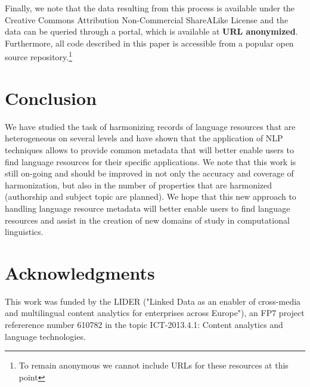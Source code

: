 \documentclass[11pt]{article}
\begin{document}
Finally, we note that the data resulting from this process is available under
the Creative Commons Attribution Non-Commercial ShareALike License and the data
can be queried through a portal, which is available at \textbf{URL anonymized}.
Furthermore, all code described in this paper is accessible from a popular open
source repository.\footnote{To remain anonymous we cannot include URLs for these
resources at this point}

\section{Conclusion}

We have studied the task of harmonizing records of language resources that are
heterogeneous on several levels and have shown that the application of NLP
techniques allows to provide common metadata that will better enable users to
find language resources for their specific applications. We note that this work
is still on-going and should be improved in not only the accuracy and coverage
of harmonization, but also in the number of properties that are harmonized
(authorship and subject topic are planned). We hope that this new approach to
handling language resource metadata will better enable users to find language
resources and assist in the creation of new domains of study in computational
linguistics.

\section*{Acknowledgments}

%

This work was funded by the LIDER ("Linked Data as an enabler of
cross-media and multilingual content analytics for enterprises across Europe"),
an FP7 project refererence number 610782 in the topic ICT-2013.4.1: Content
analytics and language technologies.



\end{document}

